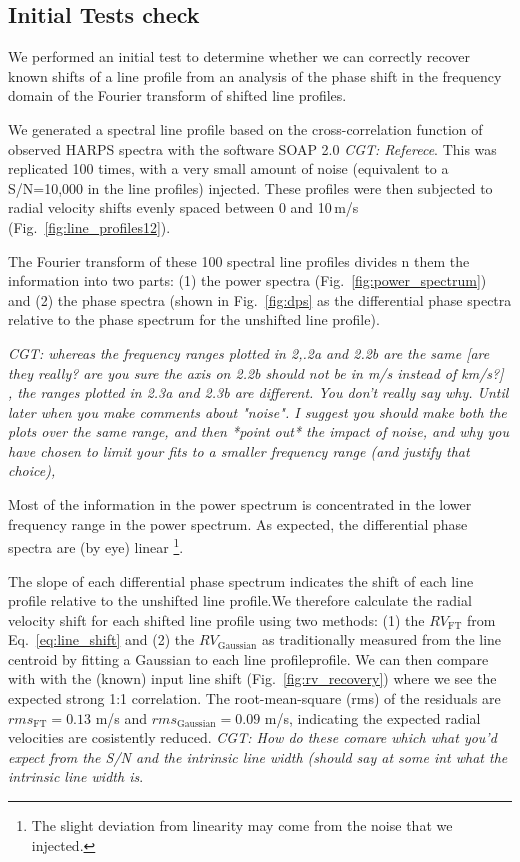 
\subsection{Initial Tests check}

We performed an initial test to determine whether we can correctly recover known shifts of a line profile  
from an analysis of the phase shift in the frequency domain of the Fourier transform of shifted line profiles.

We generated a spectral line profile based on the cross-correlation function of observed HARPS spectra
with the software SOAP 2.0 {\em CGT: Referece}. This was replicated 100 times, with a very small amount of 
noise (equivalent to a S/N=10,000 in the line profiles) injected. These profiles were then
subjected to radial velocity shifts evenly spaced between 0 and 10\,m/s (Fig.~\ref{fig:line_profiles12}). 

The Fourier transform of these 100 spectral line profiles divides n them the information into two parts: 
(1) the power spectra (Fig.~\ref{fig:power_spectrum}) and (2) the phase spectra (shown in Fig.~\ref{fig:dps}
as the differential phase spectra relative to the phase spectrum for the unshifted line profile). 

{\em CGT: whereas the frequency ranges plotted in 2,.2a and 2.2b are the same [are they really? are you sure the axis on 2.2b should not be in m/s instead of km/s?]
, the ranges plotted in 2.3a and 2.3b are different. You don't really say why. Until later when you make comments about "noise".
I suggest you should make both the plots over the same range, and then *point out* the impact of noise,
and why you have chosen to limit your fits to a smaller frequency range (and justify that choice),}

Most of the information in the power spectrum is concentrated in the lower frequency range in the power spectrum.
As expected, the differential phase spectra are (by eye) linear \footnote{The slight deviation from linearity may come from
the noise that we injected.}. 

The slope of each differential phase spectrum indicates the shift of each line profile relative to 
the unshifted line profile.We therefore calculate the radial velocity shift for each shifted line profile
using two methods: 
(1) the $RV_\text{FT}$ from Eq.~\ref{eq:line_shift} and 
(2) the $RV_\text{Gaussian}$ as traditionally measured from the line centroid by fitting a Gaussian to each line profileprofile.
We can then compare with with the (known) input line shift (Fig.~\ref{fig:rv_recovery}) where we see the expected strong 1:1 correlation. 
The root-mean-square (rms) of the residuals are $rms_\text{FT} = 0.13$ m/s and $rms_\text{Gaussian} = 0.09$ m/s, indicating 
the expected radial velocities are cosistently reduced. {\em CGT: How do these comare which what you'd expect from the S/N and the intrinsic
line width (should say at some int what the intrinsic line width is}.

